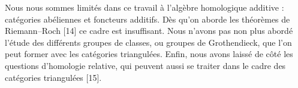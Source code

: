 Nous nous sommes limités dans ce travail à l'algèbre homologique additive :
catégories abéliennes et foncteurs additifs. Dès qu'on aborde les théorèmes
de Riemann--Roch [14] ce cadre est insuffisant.
Nous n'avons pas non plus abordé l'étude des différents groupes de classes,
ou groupes de Grothendieck, que l'on peut former avec les catégories
triangulées. Enfin, nous avons laissé de côté les questions d'homologie
relative, qui peuvent aussi se traiter dans le cadre des catégories
triangulées [15].

